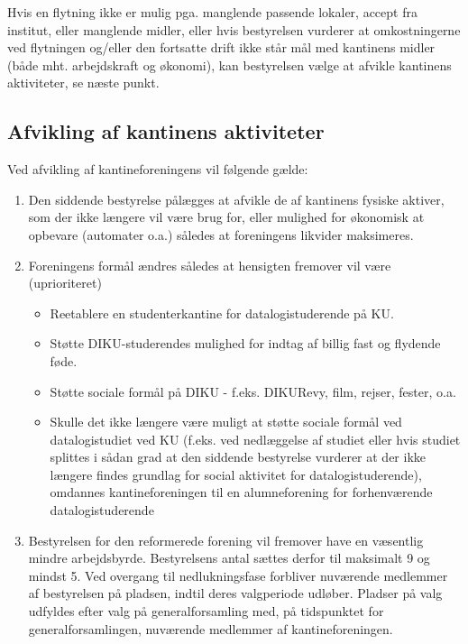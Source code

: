 \documentclass[a4paper, 10pt]{article}
\begin{document}
Hvis en flytning ikke er mulig pga. manglende passende lokaler, accept
fra institut, eller manglende midler, eller hvis bestyrelsen vurderer
at omkostningerne ved flytningen og/eller den fortsatte drift ikke
står mål med kantinens midler (både mht.  arbejdskraft og økonomi),
kan bestyrelsen vælge at afvikle kantinens aktiviteter, se næste
punkt.

\subsection*{Afvikling af kantinens aktiviteter}

Ved afvikling af kantineforeningens vil følgende gælde:

\begin{enumerate}

\item Den siddende bestyrelse pålægges at afvikle de af kantinens
fysiske aktiver, som der ikke længere vil være brug for, eller
mulighed for økonomisk at opbevare (automater o.a.) således at
foreningens likvider maksimeres.

\item Foreningens formål ændres således at hensigten fremover vil være
(uprioriteret)

\begin{itemize}

\item Reetablere en studenterkantine for datalogistuderende på KU.

\item Støtte DIKU-studerendes mulighed for indtag af billig fast og
flydende føde.

\item Støtte sociale formål på DIKU - f.eks. DIKURevy, film, rejser,
fester, o.a.

\item Skulle det ikke længere være muligt at støtte sociale formål ved
datalogistudiet ved KU (f.eks. ved nedlæggelse af studiet eller hvis
studiet splittes i sådan grad at den siddende bestyrelse vurderer at
der ikke længere findes grundlag for social aktivitet for
datalogistuderende), omdannes kantineforeningen til en alumneforening
for forhenværende datalogistuderende

\end{itemize}

\item Bestyrelsen for den reformerede forening vil fremover have en
væsentlig mindre arbejdsbyrde. Bestyrelsens antal sættes derfor til
maksimalt 9 og mindst 5. Ved overgang til nedlukningsfase forbliver
nuværende medlemmer af bestyrelsen på pladsen, indtil deres
valgperiode udløber. Pladser på valg udfyldes efter valg på
generalforsamling med, på tidspunktet for generalforsamlingen,
nuværende medlemmer af kantineforeningen.


\end{enumerate}
\end{document}
